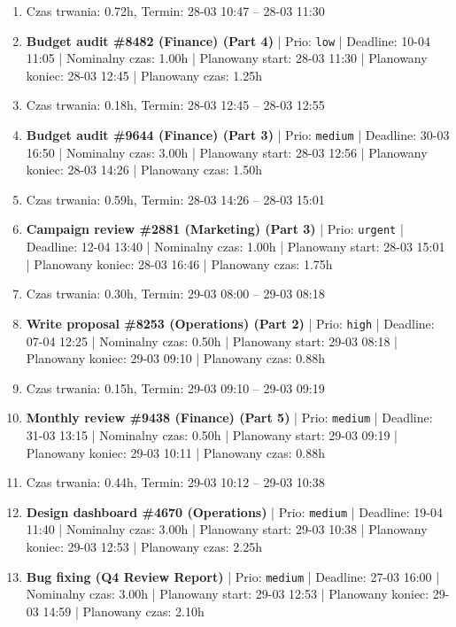 {\begin{enumerate}
  \item [\textbf{PRZERWA}] Czas trwania: 0.72h, Termin: 28-03 10:47 -- 28-03 11:30
  \item [\textbf{14694}] \textbf{Budget audit \#8482 (Finance) (Part 4)} | Prio: \texttt{low} | Deadline: 10-04 11:05 | Nominalny czas: 1.00h | Planowany start: 28-03 11:30 | Planowany koniec: 28-03 12:45 | Planowany czas: 1.25h
  \item [\textbf{PRZERWA}] Czas trwania: 0.18h, Termin: 28-03 12:45 -- 28-03 12:55
  \item [\textbf{14659}] \textbf{Budget audit \#9644 (Finance) (Part 3)} | Prio: \texttt{medium} | Deadline: 30-03 16:50 | Nominalny czas: 3.00h | Planowany start: 28-03 12:56 | Planowany koniec: 28-03 14:26 | Planowany czas: 1.50h
  \item [\textbf{PRZERWA}] Czas trwania: 0.59h, Termin: 28-03 14:26 -- 28-03 15:01
  \item [\textbf{14599}] \textbf{Campaign review \#2881 (Marketing) (Part 3)} | Prio: \texttt{urgent} | Deadline: 12-04 13:40 | Nominalny czas: 1.00h | Planowany start: 28-03 15:01 | Planowany koniec: 28-03 16:46 | Planowany czas: 1.75h
  \item [\textbf{PRZERWA}] Czas trwania: 0.30h, Termin: 29-03 08:00 -- 29-03 08:18
  \item [\textbf{14614}] \textbf{Write proposal \#8253 (Operations) (Part 2)} | Prio: \texttt{high} | Deadline: 07-04 12:25 | Nominalny czas: 0.50h | Planowany start: 29-03 08:18 | Planowany koniec: 29-03 09:10 | Planowany czas: 0.88h
  \item [\textbf{PRZERWA}] Czas trwania: 0.15h, Termin: 29-03 09:10 -- 29-03 09:19
  \item [\textbf{14656}] \textbf{Monthly review \#9438 (Finance) (Part 5)} | Prio: \texttt{medium} | Deadline: 31-03 13:15 | Nominalny czas: 0.50h | Planowany start: 29-03 09:19 | Planowany koniec: 29-03 10:11 | Planowany czas: 0.88h
  \item [\textbf{PRZERWA}] Czas trwania: 0.44h, Termin: 29-03 10:12 -- 29-03 10:38
  \item [\textbf{14676}] \textbf{Design dashboard \#4670 (Operations)} | Prio: \texttt{medium} | Deadline: 19-04 11:40 | Nominalny czas: 3.00h | Planowany start: 29-03 10:38 | Planowany koniec: 29-03 12:53 | Planowany czas: 2.25h
  \item [\textbf{14647}] \textbf{Bug fixing (Q4 Review Report)} | Prio: \texttt{medium} | Deadline: 27-03 16:00 | Nominalny czas: 3.00h | Planowany start: 29-03 12:53 | Planowany koniec: 29-03 14:59 | Planowany czas: 2.10h

\end{enumerate}}
